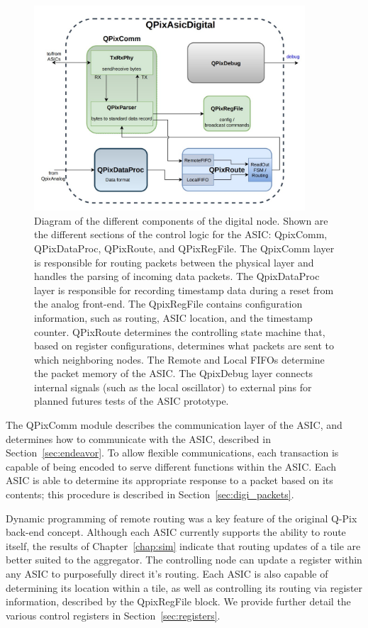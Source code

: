\begin{figure}[]
\centering
\includegraphics[width=0.9\textwidth]{images/digital_node_overview.jpg}
\caption{Diagram of the different components of the digital node.
  Shown are the different sections of the control logic for the ASIC: QpixComm, QPixDataProc, QPixRoute, and QPixRegFile.
  The QpixComm layer is responsible for routing packets between the physical layer and handles the parsing of incoming data packets.
  The QpixDataProc layer is responsible for recording timestamp data during a reset from the analog front-end.
  The QpixRegFile contains configuration information, such as routing, ASIC location, and the timestamp counter.
  QPixRoute determines the controlling state machine that, based on register configurations, determines what packets are sent to which neighboring nodes.
  The Remote and Local FIFOs determine the packet memory of the ASIC. 
  The QpixDebug layer connects internal signals (such as the local oscillator) to external pins for planned futures tests of the ASIC prototype.
  }
\label{fig:qpa_diagram}
\end{figure}

The QPixComm module describes the communication layer of the ASIC, and determines how to communicate with the ASIC, described in Section~\ref{sec:endeavor}.
To allow flexible communications, each transaction is capable of being encoded to serve different functions within the ASIC.
Each ASIC is able to determine its appropriate response to a packet based on its contents; this procedure is described in Section~\ref{sec:digi_packets}.

Dynamic programming of remote routing was a key feature of the original Q-Pix back-end concept.
Although each ASIC currently supports the ability to route itself, the results of Chapter~\ref{chap:sim} indicate that routing updates of a tile are better suited to the aggregator.
The controlling node can update a register within any ASIC to purposefully direct it's routing.
Each ASIC is also capable of determining its location within a tile, as well as controlling its routing via register information, described by the QpixRegFile block.
We provide further detail the various control registers in Section~\ref{sec:registers}.

